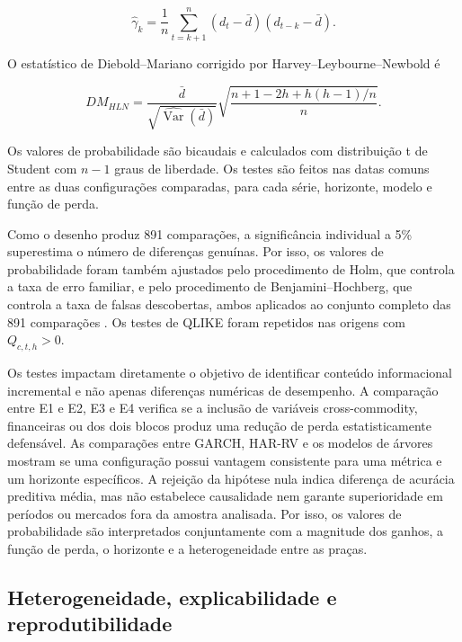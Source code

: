\documentclass[a4paper,fleqn]{cas-sc}
\begin{document}
\begin{equation}
\widehat{\gamma}_{k}
=
\frac{1}{n}
\sum_{t=k+1}^{n}
(d_t-\bar d)(d_{t-k}-\bar d).
\label{eq:dm_covariance}
\end{equation}

O estatístico de Diebold--Mariano corrigido por Harvey--Leybourne--Newbold é

\begin{equation}
DM_{HLN}
=
\frac{\bar d}{\sqrt{\widehat{\operatorname{Var}}(\bar d)}}
\sqrt{
\frac{n+1-2h+h(h-1)/n}{n}
}.
\label{eq:dm_hln}
\end{equation}

Os valores de probabilidade são bicaudais e calculados com distribuição t de Student com \(n-1\) graus de liberdade. Os testes são feitos nas datas comuns entre as duas configurações comparadas, para cada série, horizonte, modelo e função de perda.

Como o desenho produz 891 comparações, a significância individual a 5\% superestima o número de diferenças genuínas. Por isso, os valores de probabilidade foram também ajustados pelo procedimento de Holm, que controla a taxa de erro familiar, e pelo procedimento de Benjamini--Hochberg, que controla a taxa de falsas descobertas, ambos aplicados ao conjunto completo das 891 comparações \citep{Holm1979,BenjaminiHochberg1995}. Os testes de QLIKE foram repetidos nas origens com \(Q_{c,t,h}>0\).

Os testes impactam diretamente o objetivo de identificar conteúdo informacional incremental e não apenas diferenças numéricas de desempenho. A comparação entre E1 e E2, E3 e E4 verifica se a inclusão de variáveis cross-commodity, financeiras ou dos dois blocos produz uma redução de perda estatisticamente defensável. As comparações entre GARCH, HAR-RV e os modelos de árvores mostram se uma configuração possui vantagem consistente para uma métrica e um horizonte específicos. A rejeição da hipótese nula indica diferença de acurácia preditiva média, mas não estabelece causalidade nem garante superioridade em períodos ou mercados fora da amostra analisada. Por isso, os valores de probabilidade são interpretados conjuntamente com a magnitude dos ganhos, a função de perda, o horizonte e a heterogeneidade entre as praças.

\subsection{Heterogeneidade, explicabilidade e reprodutibilidade}
\label{subsec:additional_analyses}
\end{document}
